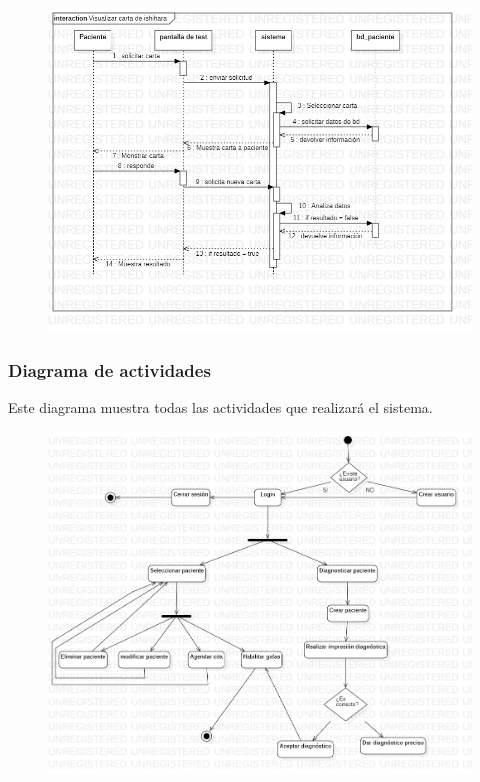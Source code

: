 \documentclass[10pt]{article}
\begin{document}
\begin{figure}[H]
	\begin{center}
\includegraphics[scale = 0.45]{UML/Secuencias/Caso_de_uso_11.jpg} 
	\end{center} 
\end{figure}

\newpage

\subsubsection{Diagrama de actividades}

Este diagrama muestra todas las actividades que realizará el sistema.

\begin{figure}[H]
	\begin{center}
\includegraphics[scale = 0.45]{UML/ActivityDiagram1.jpg}
	\end{center} 
\end{figure}
\end{document}
